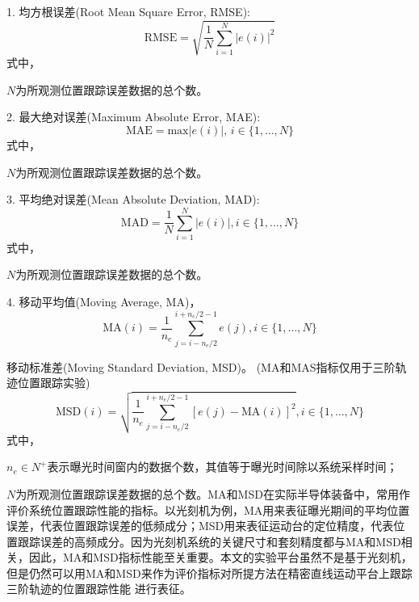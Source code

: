 	1. 均方根误差(Root Mean Square Error, RMSE):
	\begin{equation}
	\text{RMSE}=\sqrt{\frac{1}{N}\sum_{i=1}^{N}|e(i)|^{2}}
	\end{equation}
	式中，
	
	$N$为所观测位置跟踪误差数据的总个数。
	
	2. 最大绝对误差(Maximum Absolute Error, MAE):
	\begin{equation}
	\text{MAE}=\text{max}\left|e(i)\right|,\,i \in\{1, \ldots, N\}
	\end{equation}
	式中，
	
	$N$为所观测位置跟踪误差数据的总个数。
	
	3. 平均绝对误差(Mean Absolute Deviation, MAD):
	\begin{equation}
	\text{MAD}=\frac{1}{N}\sum_{i=1}^{N}|e(i)|, i \in\{1, \ldots, N\}
	\end{equation}
	式中，
	
	$N$为所观测位置跟踪误差数据的总个数。
	
	4. 移动平均值(Moving Average, MA)，
	\begin{equation}
	\text{MA}(i)=\frac{1}{n_e} \sum_{j=i-n_e / 2}^{i+n_e / 2-1} e(j), i \in\{1, \ldots, N\}
	\end{equation}
	
	移动标准差(Moving Standard Deviation, MSD)\cite{butler2011position}。	(MA和MAS指标仅用于三阶轨迹位置跟踪实验)
	\begin{equation}
	\text{MSD}(i)=\sqrt{\frac{1}{n_e} \sum_{j=i-n_e / 2}^{i+n_e / 2-1}\left[e(j)-\text{MA}(i)\right]^{2}}, i \in\{1, \ldots, N\}
	\end{equation}
	式中，
	
	$n_e\in N^{+}$表示曝光时间窗内的数据个数，其值等于曝光时间除以系统采样时间；
	
	$N$为所观测位置跟踪误差数据的总个数。MA和MSD在实际半导体装备中，常用作评价系统位置跟踪性能的指标。以光刻机为例，MA用来表征曝光期间的平均位置误差，代表位置跟踪误差的低频成分；MSD用来表征运动台的定位精度，代表位置跟踪误差的高频成分。因为光刻机系统的关键尺寸和套刻精度都与MA和MSD相关，因此，MA和MSD指标性能至关重要。本文的实验平台虽然不是基于光刻机，但是仍然可以用MA和MSD来作为评价指标对所提方法在精密直线运动平台上跟踪三阶轨迹的位置跟踪性能
	进行表征\cite{付雪微0有铁芯直线电机推力波动的分析与补偿方法研究}。

